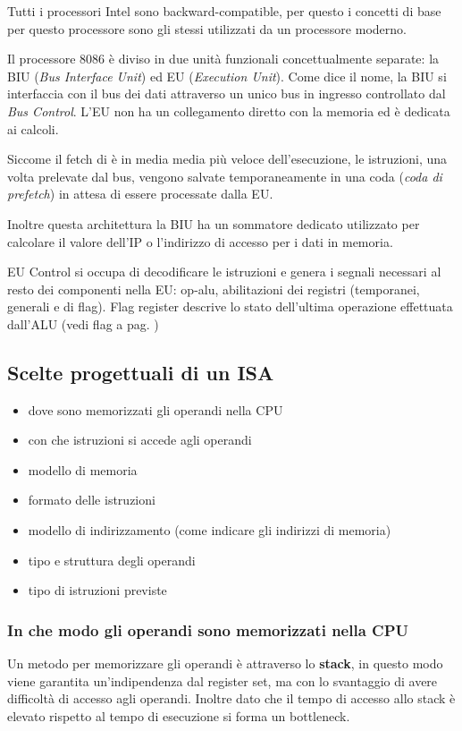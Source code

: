 \documentclass[../template]{subfiles}
\begin{document}
Tutti i processori Intel sono backward-compatible, per questo i concetti di base per questo processore sono gli stessi
utilizzati da un processore moderno.

Il processore 8086 è diviso in due unità funzionali concettualmente separate: la BIU (\textit{Bus Interface Unit}) ed EU
(\textit{Execution Unit}).
Come dice il nome, la BIU si interfaccia con il bus dei dati attraverso un unico bus in ingresso controllato dal
\textit{Bus Control}. L'EU non ha un collegamento diretto con la memoria ed è dedicata ai calcoli.

Siccome il fetch di è in media media più veloce dell'esecuzione, le istruzioni, una volta prelevate dal bus,
vengono salvate temporaneamente in una coda (\textit{coda di prefetch}) in attesa di essere processate dalla EU.

Inoltre questa architettura la BIU ha un sommatore dedicato utilizzato per calcolare il valore dell'IP o l'indirizzo di
accesso per i dati in memoria.

EU Control si occupa di decodificare le istruzioni e genera i segnali necessari al resto dei componenti nella EU:
op-alu, abilitazioni dei registri (temporanei, generali e di flag).
Flag register descrive lo stato dell'ultima operazione effettuata dall'ALU (vedi flag a pag.  \pageref{8086_flags})
\subsection{Scelte progettuali di un ISA}
\begin{itemize}
    \item dove sono memorizzati gli operandi nella CPU
    \item con che istruzioni si accede agli operandi
    \item modello di memoria
    \item formato delle istruzioni
    \item modello di indirizzamento (come indicare gli indirizzi di memoria)
    \item tipo e struttura degli operandi
    \item tipo di istruzioni previste
\end{itemize}

\subsubsection{In che modo gli operandi sono memorizzati nella CPU}
Un metodo per memorizzare gli operandi è attraverso lo \textbf{stack}, in questo modo viene garantita un'indipendenza dal
register set, ma con lo svantaggio di avere difficoltà di accesso agli operandi. Inoltre dato che il tempo di accesso allo
stack è elevato rispetto al tempo di esecuzione si forma un bottleneck.
\end{document}
